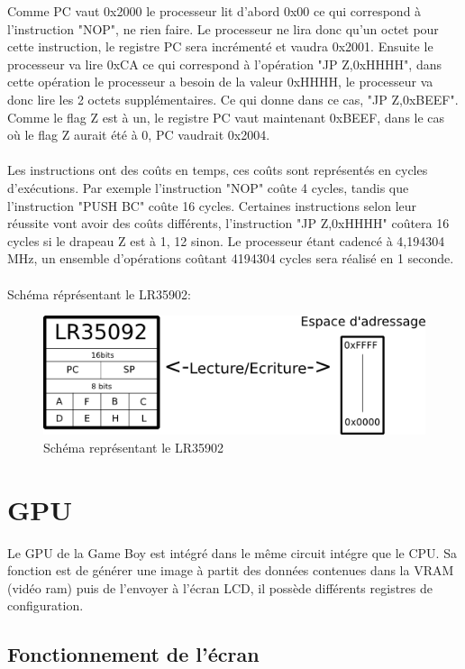 \documentclass{report}
\begin{document}
Comme PC vaut 0x2000 le processeur lit d'abord 0x00 ce qui correspond à l'instruction "NOP", ne rien faire. 
Le processeur ne lira donc qu'un octet pour cette instruction, le registre PC sera incrémenté et vaudra 0x2001.
Ensuite le processeur va lire 0xCA ce qui correspond à l'opération "JP Z,0xHHHH", dans cette opération le processeur a besoin de la valeur 0xHHHH, le processeur va donc lire les 2 octets supplémentaires. Ce qui donne dans ce cas, "JP Z,0xBEEF".
Comme le flag Z est à un, le registre PC vaut maintenant 0xBEEF, dans le cas où le flag Z aurait été à 0, PC vaudrait 0x2004.\\\\
Les instructions ont des coûts en temps, ces coûts sont représentés en cycles d'exécutions.
Par exemple l'instruction "NOP" coûte 4 cycles, tandis que l'instruction "PUSH BC" coûte 16 cycles.
Certaines instructions selon leur réussite vont avoir des coûts différents, l'instruction "JP Z,0xHHHH" coûtera 16 cycles si le drapeau Z est à 1, 12 sinon.
Le processeur étant cadencé à 4,194304 MHz, un ensemble d'opérations coûtant 4194304 cycles sera réalisé en 1 seconde.
\\\\
Schéma réprésentant le LR35902:\\
\begin{figure}[!h]
\centering
\includegraphics[scale=0.80]{images/schema_cpu.png}
\caption{Schéma représentant le LR35902}
\end{figure}
\section{GPU}

Le GPU de la Game Boy est intégré dans le même circuit intégre que le CPU. Sa fonction est de générer une image à partit des données contenues dans la VRAM (vidéo ram) puis de l'envoyer à l'écran LCD, il possède différents registres de configuration.

\subsection{Fonctionnement de l'écran}
\end{document}
